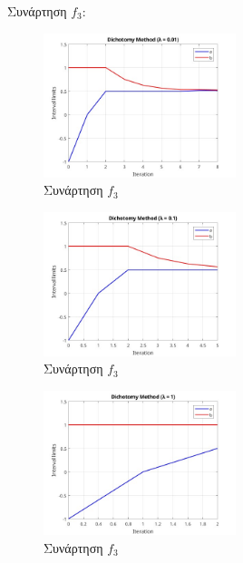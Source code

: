 Συνάρτηση $f_3$:
\begin{figure}[H] %
    \centering
    \includegraphics[width=0.5\textwidth]{media/dichotomyf3_3001} %
    \caption{Συνάρτηση $f_3$}
\end{figure}
\begin{figure}[H] %
    \centering
    \includegraphics[width=0.5\textwidth]{media/dichotomyf3_301} %
    \caption{Συνάρτηση $f_3$}
\end{figure}
\begin{figure}[H] %
    \centering
    \includegraphics[width=0.5\textwidth]{media/dichotomyf3_31} %
    \caption{Συνάρτηση $f_3$}
\end{figure}